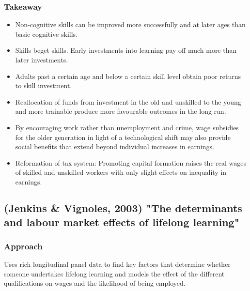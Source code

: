 \documentclass[12pt,a4paper]{article}
\begin{document}
      \subsubsection{Takeaway}
      \begin{itemize}
        \item Non-cognitive skills can be improved more successfully and at later ages than basic cognitive skills.
        \item Skills beget skills. Early investments into learning pay off much more than later investments.
        \item Adults past a certain age and below a certain skill level obtain poor returns to skill investment.
        \item Reallocation of funds from investment in the old and unskilled to the young and more trainable produce more favourable outcomes in the long run.
        \item  By encouraging work rather than unemployment and crime, wage subsidies for the older generation in light of a technological shift may also provide social benefits that extend beyond individual increases in earnings.
        \item Reformation of tax system: Promoting capital formation raises the real wages of skilled and unskilled workers with only slight effects on inequality in earnings.
      \end{itemize}


    \subsection{(Jenkins \& Vignoles, 2003) "The determinants and labour market effects of lifelong learning"}
      \subsubsection{Approach}
      Uses rich longitudinal panel data to find key factors that determine whether someone undertakes lifelong learning and models the effect of the different qualifications on wages and the likelihood of being employed.
\end{document}
